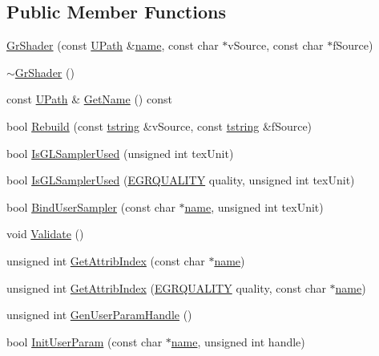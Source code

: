 \begin{CompactItemize}
\subsection*{Public Member Functions}
\begin{CompactItemize}
\item 
\hyperlink{class_gr_shader_bdf1c0db4547dc0f83a672954a110ee3}{GrShader} (const \hyperlink{class_u_path}{UPath} \&\hyperlink{glext__bak_8h_bb62efe59ccdd153ce42e1a418352209}{name}, const char $\ast$vSource, const char $\ast$fSource)
\item 
\hyperlink{class_gr_shader_aa73966b218a209656f7e2c594d290ce}{$\sim$GrShader} ()
\item 
const \hyperlink{class_u_path}{UPath} \& \hyperlink{class_gr_shader_adfcd8e36a3b4d3b12fc77b009c6f1c6}{GetName} () const 
\item 
bool \hyperlink{class_gr_shader_f9ce91e69a32ecd1ec6aa457c5fff942}{Rebuild} (const \hyperlink{common__afx_8h_816fa58fd77499b0edb2c69ebe803d5c}{tstring} \&vSource, const \hyperlink{common__afx_8h_816fa58fd77499b0edb2c69ebe803d5c}{tstring} \&fSource)
\item 
bool \hyperlink{class_gr_shader_e40cd62323e0186bd30977b00617516e}{IsGLSamplerUsed} (unsigned int texUnit)
\item 
bool \hyperlink{class_gr_shader_64b1416ca1fd91ff9da4a37bbbf5bb0e}{IsGLSamplerUsed} (\hyperlink{enums_8h_697c1ee1354746841860d5bf9f81c033}{EGRQUALITY} quality, unsigned int texUnit)
\item 
bool \hyperlink{class_gr_shader_a482dc096d94ac3e751bce76dcae167b}{BindUserSampler} (const char $\ast$\hyperlink{glext__bak_8h_bb62efe59ccdd153ce42e1a418352209}{name}, unsigned int texUnit)
\item 
void \hyperlink{class_gr_shader_420e8f1956844878d2a8aeb09f0ab888}{Validate} ()
\item 
unsigned int \hyperlink{class_gr_shader_94d6c2ccfc6e5b98ed4fee018308b5cb}{GetAttribIndex} (const char $\ast$\hyperlink{glext__bak_8h_bb62efe59ccdd153ce42e1a418352209}{name})
\item 
unsigned int \hyperlink{class_gr_shader_6aaf2b4a333467d7c254dd2f4d862a83}{GetAttribIndex} (\hyperlink{enums_8h_697c1ee1354746841860d5bf9f81c033}{EGRQUALITY} quality, const char $\ast$\hyperlink{glext__bak_8h_bb62efe59ccdd153ce42e1a418352209}{name})
\item 
unsigned int \hyperlink{class_gr_shader_c7df07b490ebee35fc316ccdccaf0a91}{GenUserParamHandle} ()
\item 
bool \hyperlink{class_gr_shader_e95cb134961fe00f4c4cd59e52d2d136}{InitUserParam} (const char $\ast$\hyperlink{glext__bak_8h_bb62efe59ccdd153ce42e1a418352209}{name}, unsigned int handle)

\end{CompactItemize}
\end{CompactItemize}
